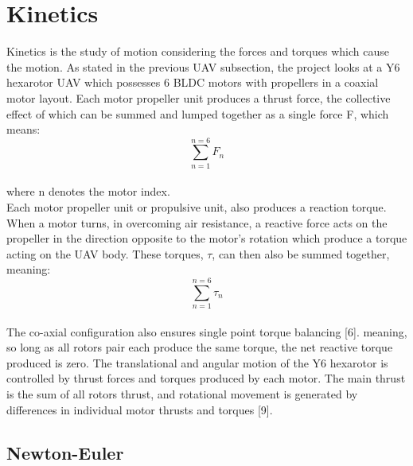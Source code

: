 \documentclass[12pt,a4paper,twoside]{report}
\begin{document}
			\section{Kinetics}
			
			Kinetics is the study of motion considering the forces and torques which cause the motion. As stated in the previous UAV subsection, the project looks at a Y6 hexarotor UAV which possesses 6 BLDC motors with propellers in a coaxial motor layout. Each motor propeller unit produces a thrust force, the collective effect of which can be summed and lumped together as a single force F, which means:
			\\
			\[\sum_{n = 1}^{n = 6}F_n\]
			\\
			where n denotes the motor index.
			\\
			Each motor propeller unit or propulsive unit, also produces a reaction torque. When a motor turns, in overcoming air resistance, a reactive force acts on the propeller in the direction opposite to the motor's rotation which produce a torque acting on the UAV body. These torques, $\tau$, can then also be summed together, meaning:
			\\
			\[\sum_{n = 1}^{n = 6}\tau_n\] 
			\\
			The co-axial configuration also ensures single point torque balancing [6]. meaning, so long as all rotors pair each produce the same torque, the net reactive torque produced is zero. The translational and angular motion of the Y6 hexarotor is controlled by thrust forces and torques produced by each motor. The main thrust is the sum of all rotors thrust, and rotational movement is generated by differences in individual  motor thrusts and torques [9].
				
			\subsection{Newton-Euler}
				
\end{document}

